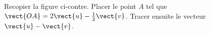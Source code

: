 
\begin{exercice}\label{exosmath-0068}

    \begin{multicols}{2}
        Recopier la figure ci-contre. Placer le point \( A\) tel que \( \vect{ OA }=2\vect{ u }-\frac{ 1 }{2}\vect{ v }\). Tracer ensuite le vecteur \( \vect{ u }-\vect{ v }\).

        \columnbreak



    \end{multicols}

\end{exercice}

